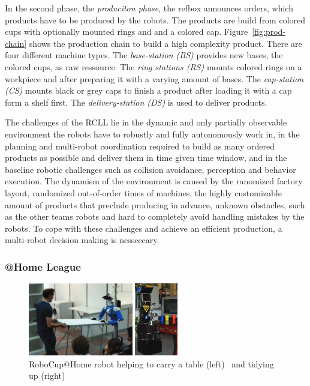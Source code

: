 \documentclass[a4paper,11pt]{article}
\newcommand{\reffig}[1]{Figure~\ref{#1}}
\begin{document}
%
In the second phase, the \emph{produciton phase}, the refbox announces
orders, which products have to be produced by the robots. The products
are build from colored cups with optionally mounted rings and and a
colored cap. \reffig{fig:prod-chain} shows the production chain to
build a high complexity product. There are four different machine
types. The \emph{base-station (BS)} provides new bases, the colored
cups, as raw ressource. The \emph{ring stations (RS)} mounts colored
rings on a workpiece and after preparing it with a varying amount of
bases. The \emph{cap-station (CS)} mounts black or grey caps to finish
a product after loading it with a cap form a shelf first. The
\emph{delivery-station (DS)} is used to deliver products.

The challenges of the RCLL lie in the dynamic and only partially
observable environment the robots have to robustly and fully
autonomously work in, in the planning and multi-robot coordination
required to build as many ordered products as possible and deliver
them in time given time window, and in the baseline robotic challenges
such as collision avoidance, perception and behavior execution. The
dynamism of the environment is caused by the ranomized factory layout,
randomized out-of-order times of machines, the highly customizable
amount of products that preclude producing in advance, unknown
obstacles, such as the other teams robots and hard to completely avoid
handling mistakes by the robots. To cope with these challenges and
achieve an efficient production, a multi-robot decision making is
nesseccary.

\subsubsection{@Home League}


\begin{figure}[t]
  \centering
  \begin{minipage}{.6\linewidth}
    \includegraphics[height=120px]{img/athome-table}%
  \end{minipage}
  \quad%
  \begin{minipage}{.35\linewidth}
  \includegraphics[height=120px]{img/ceasar}%
  \end{minipage}
  \caption{RoboCup@Home robot helping to carry a table
    (left)~\cite{athome-bit} and tidying up
    (right)~\cite{wisspeintner2009robocup}}
  \vspace{-2mm}
  \label{fig:athome}
\end{figure}
\end{document}
